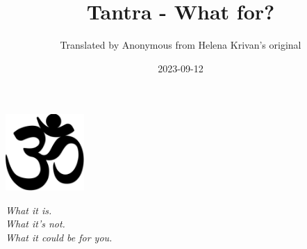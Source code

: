 \documentclass{article}
\title{Tantra - What for?}
\date{2023-09-12}
\author{Translated by Anonymous from Helena Krivan's original}
\begin{document}
\maketitle

\begin{center}
	\includegraphics[width=3cm]{images/namaste.jpg}
	\vspace{0.5cm}
	
	\textit{What it is.}\\
	\textit{What it's not.}\\
	\textit{What it could be for you.}
\end{center}
\newpage

\tableofcontents
\newpage
























\end{document}
